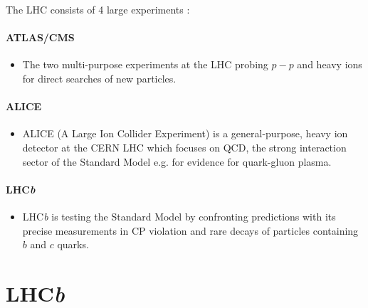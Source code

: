 \documentclass[11pt,twoside]{scrreprt}
\begin{document}
The LHC consists of 4 large experiments \parencite{Aad2008,Aamodt2008,AlvesJr2008,Collaboration2008}:

\paragraph{ATLAS/CMS}
  \begin{itemize}
    \item The two multi-purpose experiments at the LHC probing $p-p$ and heavy ions for direct searches of new particles.
  \end{itemize}
\paragraph{ALICE}
  \begin{itemize}
    \item ALICE (A Large Ion Collider Experiment) is a general-purpose, heavy ion detector at the CERN LHC
    which focuses on QCD, the strong interaction sector of the Standard Model e.g. for evidence for quark-gluon
    plasma.
  \end{itemize}
\paragraph{LHC\textit{b}}
  \begin{itemize}
    \item LHC\textit{b} is testing the Standard Model by confronting predictions with its precise measurements in CP
    violation and rare decays of particles containing $b$ and $c$ quarks.
  \end{itemize}




\section{LHC\textit{b}}
\end{document}
